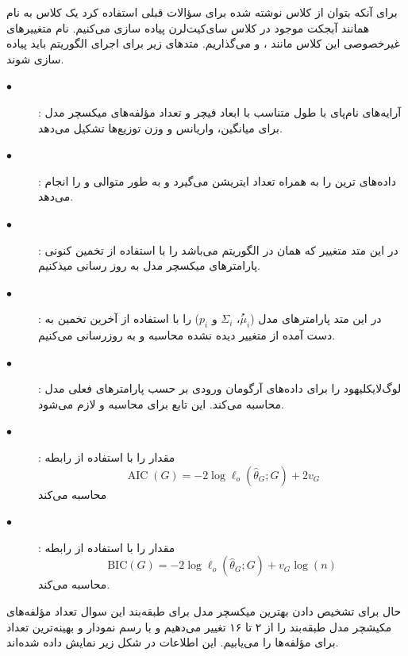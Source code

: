 \documentclass[12pt,onecolumn,a4paper]{article}
\begin{document}
برای آنکه بتوان از کلاس  نوشته شده برای سؤالات قبلی استفاده کرد یک کلاس به نام  همانند آبجکت موجود در کلاس سای‌کیت‌لرن پیاده سازی می‌کنیم. نام متغییرهای غیرخصوصی این کلاس مانند ،  و  می‌گذاریم. متدهای زیر برای اجرای الگوریتم  باید پیاده سازی شوند.
\begin{description}
    \item[$\bullet$] : آرایه‌های نام‌پای با طول متناسب با ابعاد فیچر و تعداد مؤلفه‌های میکسچر مدل برای میانگین، واریانس و وزن توزیع‌ها تشکیل می‌دهد.
    \item[$\bullet$] : داده‌های ترین را به همراه تعداد ایتریشن می‌گیرد و به طور متوالی  و  را انجام می‌دهد.
    \item[$\bullet$] : در این متد متغییر  که همان  در الگوریتم  می‌باشد را با استفاده از تخمین کنونی پارامترهای میکسچر مدل به روز رسانی میذکنیم.
    \item[$\bullet$] : در این متد پارامترهای مدل ($\mu_{i}$ُ، $\Sigma_{i}$ و $p_{i}$) را با استفاده از آخرین تخمین به دست آمده از متغییر دیده نشده محاسبه و به روزرسانی می‌کنیم.
    \item[$\bullet$] : لوگ‌لایکلیهود را برای داده‌های آرگومان ورودی بر حسب پارامترهای فعلی مدل محاسبه می‌کند. این تابع برای محاسبه  و  لازم می‌شود.
    \item[$\bullet$] : مقدار  را با استفاده از رابطه $$\operatorname{AIC}(G)=-2 \log \ell_{o}\left(\hat{\theta}_{G} ; G\right)+2 v_{G}$$ محاسبه می‌کند
    \item[$\bullet$] : مقدار  را با استفاده از رابطه $$\mathrm{BIC}(G)=-2 \log \ell_{o}\left(\hat{\theta}_{G} ; G\right)+v_{G} \log (n)$$ محاسبه می‌کند.
\end{description}
حال برای تشخیص دادن بهترین میکسچر مدل برای طبقه‌بند این سوال تعداد مؤلفه‌های مکیشچر مدل طبقه‌بند را از ۲ تا ۱۶ تغییر می‌دهیم و با رسم نمودار  و  بهینه‌ترین تعداد برای مؤلفه‌ها را می‌یابیم. این اطلاعات در شکل زیر نمایش داده شده‌اند.
\end{document}
